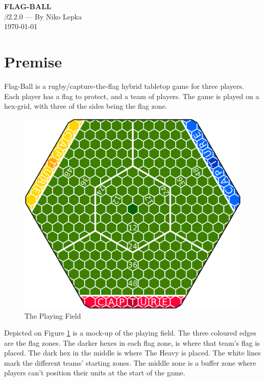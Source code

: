 \documentclass[a4paper]{book}
\begin{document}
\begin{titlepage}
\begin{center}
    \huge{\textbf{FLAG-BALL}}\\
    \LARGE{$\beta2.2.0$ --- By Niko Lepka}\\
    \Large{\today}
\end{center}
\end{titlepage}
\thispagestyle{empty} %
\frontmatter %

\section*{Premise}
Flag-Ball is a rugby/capture-the-flag hybrid tabletop game for three players.
Each player has a flag to protect, and a team of players.
The game is played on a hex-grid, with three of the sides being the flag zone.
\begin{figure}
    \centering
    \includegraphics[width=\textwidth]{graphics/board-2}
    \caption{The Playing Field}
    \label{fig:court}
\end{figure}
Depicted on Figure \ref{fig:court} is a mock-up of the playing field.
The three coloured edges are the flag zones.
The darker hexes in each flag zone, is where that team's flag is placed.
The dark hex in the middle is where The Heavy is placed.
The white lines mark the different teams' starting zones.
The middle zone is a buffer zone where players can’t position their units at the start of the game.

\tableofcontents
\mainmatter




\end{document}

